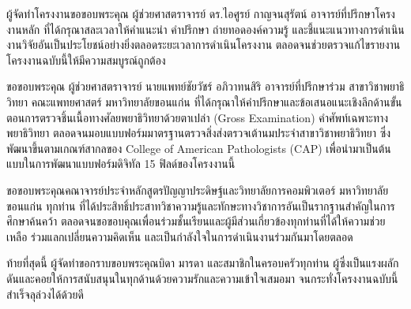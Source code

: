 ผู้จัดทำโครงงานขอขอบพระคุณ ผู้ช่วยศาสตราจารย์ ดร.ไอศูรย์ กาญจนสุรัตน์ อาจารย์ที่ปรึกษาโครงงานหลัก ที่ได้กรุณาสละเวลาให้คำแนะนำ คำปรึกษา ถ่ายทอดองค์ความรู้ และชี้แนะแนวทางการดำเนินงานวิจัยอันเป็นประโยชน์อย่างยิ่งตลอดระยะเวลาการดำเนินโครงงาน ตลอดจนช่วยตรวจแก้ไขรายงานโครงงานฉบับนี้ให้มีความสมบูรณ์ถูกต้อง

ขอขอบพระคุณ ผู้ช่วยศาสตราจารย์ นายแพทย์ชัยวัชร์ อภิวาทนสิริ อาจารย์ที่ปรึกษาร่วม สาขาวิชาพยาธิวิทยา คณะแพทยศาสตร์ มหาวิทยาลัยขอนแก่น ที่ได้กรุณาให้คำปรึกษาและข้อเสนอแนะเชิงลึกด้านขั้นตอนการตรวจชิ้นเนื้อทางศัลยพยาธิวิทยาด้วยตาเปล่า (Gross Examination) คำศัพท์เฉพาะทางพยาธิวิทยา ตลอดจนมอบแบบฟอร์มมาตรฐานตรวจสิ่งส่งตรวจเต้านมประจำสาขาวิชาพยาธิวิทยา ซึ่งพัฒนาขึ้นตามเกณฑ์สากลของ College of American Pathologists (CAP) เพื่อนำมาเป็นต้นแบบในการพัฒนาแบบฟอร์มดิจิทัล 15 ฟิลด์ของโครงงานนี้

ขอขอบพระคุณคณาจารย์ประจำหลักสูตรปัญญาประดิษฐ์และวิทยาลัยการคอมพิวเตอร์ มหาวิทยาลัยขอนแก่น ทุกท่าน ที่ได้ประสิทธิ์ประสาทวิชาความรู้และทักษะทางวิชาการอันเป็นรากฐานสำคัญในการศึกษาค้นคว้า ตลอดจนขอขอบคุณเพื่อนร่วมชั้นเรียนและผู้มีส่วนเกี่ยวข้องทุกท่านที่ได้ให้ความช่วยเหลือ ร่วมแลกเปลี่ยนความคิดเห็น และเป็นกำลังใจในการดำเนินงานร่วมกันมาโดยตลอด

ท้ายที่สุดนี้ ผู้จัดทำขอกราบขอบพระคุณบิดา มารดา และสมาชิกในครอบครัวทุกท่าน ผู้ซึ่งเป็นแรงผลักดันและคอยให้การสนับสนุนในทุกด้านด้วยความรักและความเข้าใจเสมอมา จนกระทั่งโครงงานฉบับนี้สำเร็จลุล่วงได้ด้วยดี

